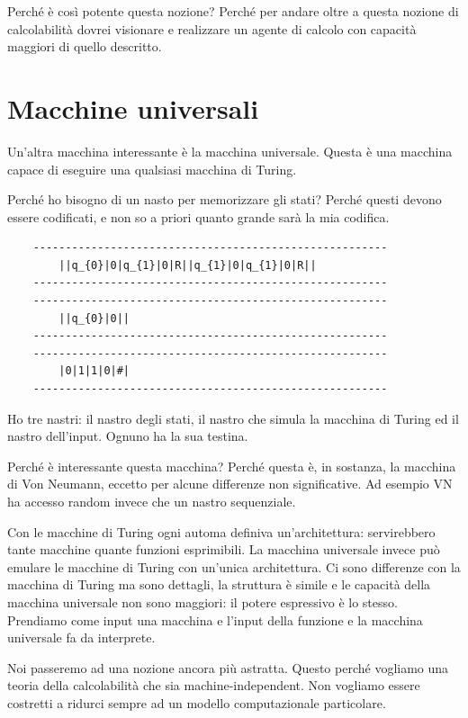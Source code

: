 Perché è così potente questa nozione? Perché per andare oltre a questa nozione di calcolabilità
dovrei visionare e realizzare un agente di calcolo con capacità maggiori di quello descritto.

\section{Macchine universali}

Un'altra macchina interessante è la macchina universale. Questa è una macchina capace di eseguire
una qualsiasi macchina di Turing.

Perché ho bisogno di un nasto per memorizzare gli stati? Perché questi devono essere codificati, e
non so a priori quanto grande sarà la mia codifica.

\begin{verbatim}
    -------------------------------------------------------
        ||q_{0}|0|q_{1}|0|R||q_{1}|0|q_{1}|0|R||
    -------------------------------------------------------
    -------------------------------------------------------
        ||q_{0}|0||
    -------------------------------------------------------
    -------------------------------------------------------
        |0|1|1|0|#|
    -------------------------------------------------------
\end{verbatim}

Ho tre nastri: il nastro degli stati, il nastro che simula la macchina di Turing ed il nastro
dell'input. Ognuno ha la sua testina.

Perché è interessante questa macchina? Perché questa è, in sostanza, la macchina di Von Neumann,
eccetto per alcune differenze non significative. Ad esempio VN ha accesso random invece che un nastro
sequenziale.

Con le macchine di Turing ogni automa definiva un'architettura: servirebbero tante macchine quante
funzioni esprimibili. La macchina universale invece può emulare le macchine di Turing con un'unica
architettura. Ci sono differenze con la macchina di Turing ma sono dettagli, la struttura è simile e
le capacità della macchina universale non sono maggiori: il potere espressivo è lo stesso.
Prendiamo come input una macchina e l'input della funzione e la macchina universale fa da
interprete.

Noi passeremo ad una nozione ancora più astratta. Questo perché vogliamo una teoria della
calcolabilità che sia machine-independent. Non vogliamo essere costretti a ridurci sempre ad un
modello computazionale particolare.

